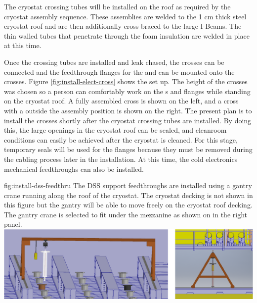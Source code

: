 The cryostat crossing tubes will be installed on the roof as required by the cryostat assembly sequence. 
These assemblies are welded to the 1 \si{cm} thick steel cryostat roof and are then additionally cross braced to the large I-Beams. 
The thin walled tubes that penetrate through the foam insulation are welded in place at this time. 


Once the crossing tubes are installed and leak chased, the  crosses can be connected and the feedthrough flanges for the  and  can be mounted onto the crosses. Figure \ref{fig:install-elect-cross} shows the set up. 
The height of the crosses was chosen so a person can comfortably work on the s  and  flanges while standing on the cryostat roof. 
A fully assembled cross is shown on the left, and a cross with a  outside the assembly position is shown on the right. 
The present plan is to install the crosses shortly after the cryostat crossing tubes are installed. 
By doing this, the large openings in the cryostat roof can be sealed, and cleanroom conditions can easily be achieved after the cryostat is cleaned. 
For this stage, temporary seals will be used for the flanges because they must be removed during the cabling process later in the installation. At this time, the cold electronics mechanical feedthroughs can also be installed. 

\begin{dunefigure}{fig:install-dss-feedthru}
  {The DSS support feedthroughs are installed using a gantry crane running along the roof of the cryostat. The cryostat decking is not shown in this figure but the gantry will be able to move freely on the cryostat roof decking. The gantry crane is selected to fit under the mezzanine as shown on in the right panel.}
  \includegraphics[width=.98\textwidth]{graphics/install-dss-feedthru-v2.pdf}
\end{dunefigure}

